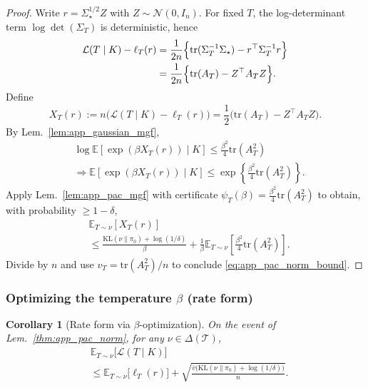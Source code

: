 \documentclass{article}
\theoremstyle{plain}
\newtheorem{corollary}[theorem]{Corollary}
\theoremstyle{definition}
\theoremstyle{remark}
\begin{document}
\begin{proof}
Write $r=\Sigma_\star^{1/2}Z$ with $Z\sim\mathcal N(0,I_n)$.
For fixed $T$, the log-determinant term $\log\det(\Sigma_T)$ is deterministic, hence
\begin{align*}
    \mathcal L(T\mid K)-\ell_T(r) 
    &= \frac{1}{2n}\Bigl\{ \mathrm{tr}(\Sigma_T^{-1}\Sigma_\star) - r^\top\Sigma_T^{-1}r \Bigr\}  \\
    &= \frac{1}{2n}\Bigl\{ \mathrm{tr}(A_T) - Z^\top A_T Z \Bigr\}.
\end{align*}
Define
\begin{equation}
X_T(r) := n\bigl(\mathcal L(T\mid K)-\ell_T(r)\bigr)
=\frac{1}{2}\bigl(\mathrm{tr}(A_T)-Z^\top A_T Z\bigr).
\label{eq:app_XT_def}
\end{equation}
By Lem.~\ref{lem:app_gaussian_mgf},
\begin{align*}
    &\log \mathbb E[\exp(\beta X_T(r))\mid K] \le \frac{\beta^2}{4}\mathrm{tr}(A_T^2)\\
    &\Rightarrow \mathbb E[\exp(\beta X_T(r))\mid K]\le \exp\!\left\{\frac{\beta^2}{4}\mathrm{tr}(A_T^2)\right\}.
\end{align*}
Apply Lem.~\ref{lem:app_pac_mgf} with certificate $\psi_T(\beta)=\frac{\beta^2}{4}\mathrm{tr}(A_T^2)$ to obtain,
with probability $\ge 1-\delta$,
\begin{align*}
    &\mathbb E_{T\sim\nu}[X_T(r)] \\
    &\le \frac{\mathrm{KL}(\nu\|\pi_0)+\log(1/\delta)}{\beta} + \frac{1}{\beta}\mathbb E_{T\sim\nu}\!\left[\frac{\beta^2}{4}\mathrm{tr}(A_T^2)\right].
\end{align*}
Divide by $n$ and use $v_T=\mathrm{tr}(A_T^2)/n$ to conclude \eqref{eq:app_pac_norm_bound}.
\end{proof}

\subsubsection{Optimizing the temperature $\beta$ (rate form)}
\label{app:pac_beta_opt}

\begin{corollary}[Rate form via $\beta$-optimization]
\label{cor:app_pac_rate}
On the event of Lem.~\ref{thm:app_pac_norm}, for any $\nu\in\Delta(\mathcal T)$,
\begin{align}
&\mathbb E_{T\sim\nu}\bigl[\mathcal L(T\mid K)\bigr] \\
&\le  \mathbb E_{T\sim\nu}\bigl[\ell_T(r)\bigr] + \sqrt{\frac{\bar v\bigl(\mathrm{KL}(\nu\|\pi_0)+\log(1/\delta)\bigr)}{n}}.
\label{eq:app_pac_rate}
\end{align}
\end{corollary}
\end{document}
